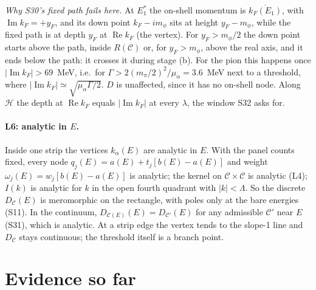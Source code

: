 \documentclass[11pt]{article}
\begin{document}
\emph{Why S30's fixed path fails here.} At $E_1^*$ the on-shell momentum is $\overline{k_F(E_1)}$, with $\operatorname{Im}k_F=+y_F$, and its down point $k_F-im_\phi$ sits at height $y_F-m_\phi$, while the fixed path is at depth $y_F$ at $\operatorname{Re}k_F$ (the vertex). For $y_F>m_\phi/2$ the down point starts above the path, inside $R(\mathcal C)$ or, for $y_F>m_\phi$, above the real axis, and it ends below the path: it crosses it during stage (b). For the pion this happens once $|\operatorname{Im}k_F|>69$~MeV, i.e.\ for $\Gamma>2(m_\pi/2)^2/\mu_\alpha=3.6$~MeV next to a threshold, where $|\operatorname{Im}k_F|\simeq\sqrt{\mu_\alpha\Gamma/2}$. $D$ is unaffected, since it has no on-shell node. Along $\mathcal H$ the depth at $\operatorname{Re}k_F$ equals $|\operatorname{Im}k_F|$ at every $\lambda$, the window S32 asks for.

\paragraph{L6: analytic in $E$.} Inside one strip the vertices $k_\alpha(E)$ are analytic in $E$. With the panel counts fixed, every node $q_j(E)=a(E)+t_j[b(E)-a(E)]$ and weight $\omega_j(E)=w_j[b(E)-a(E)]$ is analytic; the kernel on $\mathcal C\times\mathcal C$ is analytic (L4); $I(k)$ is analytic for $k$ in the open fourth quadrant with $|k|<\Lambda$. So the discrete $D_{\mathcal C}(E)$ is meromorphic on the rectangle, with poles only at the bare energies (S11). In the continuum, $D_{\mathcal C(E)}(E)=D_{\mathcal C'}(E)$ for any admissible $\mathcal C'$ near $E$ (S31), which is analytic. At a strip edge the vertex tends to the slope-1 line and $D_{\mathcal C}$ stays continuous; the threshold itself is a branch point.

\section{Evidence so far}\label{sec:evidence}
\end{document}
